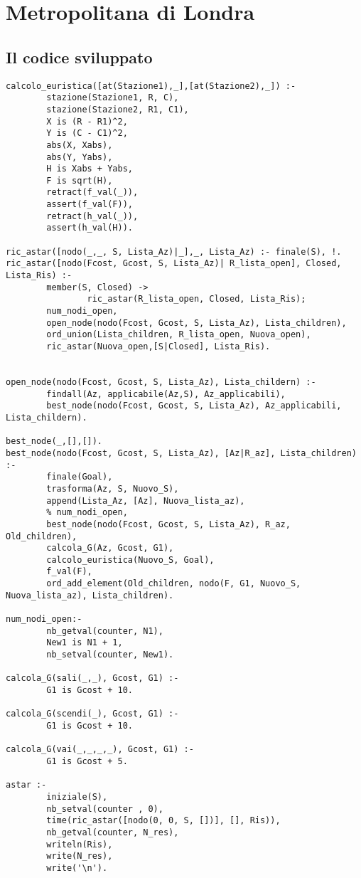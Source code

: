 \chapter{Metropolitana di Londra}

\section{Il codice sviluppato}

\begin{lstlisting}
calcolo_euristica([at(Stazione1),_],[at(Stazione2),_]) :-
        stazione(Stazione1, R, C),
        stazione(Stazione2, R1, C1),
        X is (R - R1)^2,
        Y is (C - C1)^2,
        abs(X, Xabs),
        abs(Y, Yabs),
        H is Xabs + Yabs,
        F is sqrt(H),
        retract(f_val(_)),
        assert(f_val(F)),
        retract(h_val(_)),
        assert(h_val(H)).

ric_astar([nodo(_,_, S, Lista_Az)|_],_, Lista_Az) :- finale(S), !.
ric_astar([nodo(Fcost, Gcost, S, Lista_Az)| R_lista_open], Closed, Lista_Ris) :-
        member(S, Closed) ->
                ric_astar(R_lista_open, Closed, Lista_Ris);
        num_nodi_open,
        open_node(nodo(Fcost, Gcost, S, Lista_Az), Lista_children),
        ord_union(Lista_children, R_lista_open, Nuova_open),
        ric_astar(Nuova_open,[S|Closed], Lista_Ris).


open_node(nodo(Fcost, Gcost, S, Lista_Az), Lista_childern) :-
        findall(Az, applicabile(Az,S), Az_applicabili),
        best_node(nodo(Fcost, Gcost, S, Lista_Az), Az_applicabili, Lista_childern).

best_node(_,[],[]).
best_node(nodo(Fcost, Gcost, S, Lista_Az), [Az|R_az], Lista_children) :-
        finale(Goal),
        trasforma(Az, S, Nuovo_S),
        append(Lista_Az, [Az], Nuova_lista_az),
        % num_nodi_open,
        best_node(nodo(Fcost, Gcost, S, Lista_Az), R_az, Old_children),
        calcola_G(Az, Gcost, G1),
        calcolo_euristica(Nuovo_S, Goal),
        f_val(F),
        ord_add_element(Old_children, nodo(F, G1, Nuovo_S, Nuova_lista_az), Lista_children).

num_nodi_open:-
        nb_getval(counter, N1),
        New1 is N1 + 1,
        nb_setval(counter, New1).

calcola_G(sali(_,_), Gcost, G1) :-
        G1 is Gcost + 10.

calcola_G(scendi(_), Gcost, G1) :-
        G1 is Gcost + 10.

calcola_G(vai(_,_,_,_), Gcost, G1) :-
        G1 is Gcost + 5.

astar :-
        iniziale(S),
        nb_setval(counter , 0),
        time(ric_astar([nodo(0, 0, S, [])], [], Ris)),
        nb_getval(counter, N_res),
        writeln(Ris),
        write(N_res),
        write('\n').
\end{lstlisting}

